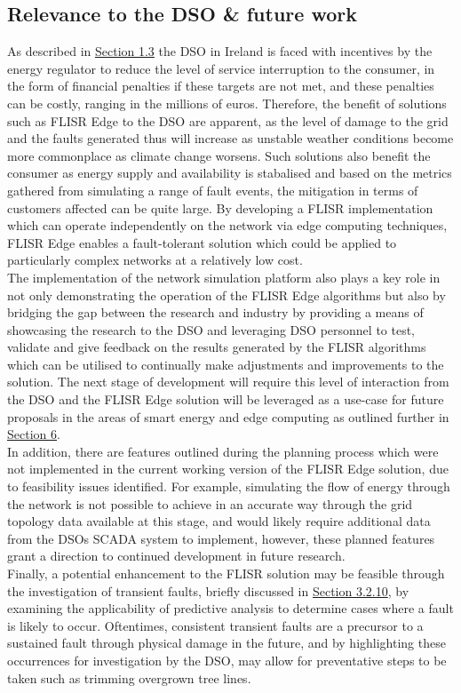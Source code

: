 \subsection{Relevance to the DSO \& future work}
\label{sec:relevance}

\noindent As described in \hyperref[sec:motivation]{Section 1.3} the DSO in Ireland is faced with incentives by the energy regulator to reduce the level of service interruption
to the consumer, in the form of financial penalties if these targets are not met, and these penalties can be costly, ranging in the millions of euros. Therefore, the benefit of
solutions such as FLISR Edge to the DSO are apparent, as the level of damage to the grid and the faults generated thus will increase as unstable weather conditions become more commonplace
as climate change worsens. Such solutions also benefit the consumer as energy supply and availability is stabalised and based on the metrics gathered from simulating a
range of fault events, the mitigation in terms of customers affected can be quite large. By developing a FLISR implementation which can operate independently on the network via edge computing
techniques, FLISR Edge enables a fault-tolerant solution which could be applied to particularly complex networks at a relatively low cost.
\\
The implementation of the network simulation platform also plays a key role in not only demonstrating the operation of the FLISR Edge algorithms but also by bridging the gap
between the research and industry by providing a means of showcasing the research to the DSO and leveraging DSO personnel to test, validate and give feedback on the results generated by the
FLISR algorithms which can be utilised to continually make adjustments and improvements to the solution.
The next stage of development will require this level of interaction from the DSO and the FLISR Edge solution will be leveraged as a use-case for future proposals in the areas of
smart energy and edge computing as outlined further in \hyperref[sec:exploitation]{Section 6}.
\\
In addition, there are features outlined during the planning process which were not implemented in the current working version of the FLISR Edge solution, due to feasibility issues identified.
For example, simulating the flow of energy through the network is not possible to achieve in an accurate way through the grid topology data available at this stage, and would likely require
additional data from the DSOs SCADA system to implement, however, these planned features grant a direction to continued development in future research.
\\
Finally, a potential enhancement to the FLISR solution may be feasible through the investigation of transient faults, briefly discussed in \hyperref[sec:flisr_edge]{Section 3.2.10}, by
examining the applicability of predictive analysis to determine cases where a fault is likely to occur. Oftentimes, consistent transient faults are a precursor to a sustained fault through
physical damage in the future, and by highlighting these occurrences for investigation by the DSO, may allow for preventative steps to be taken such as trimming overgrown tree lines.

